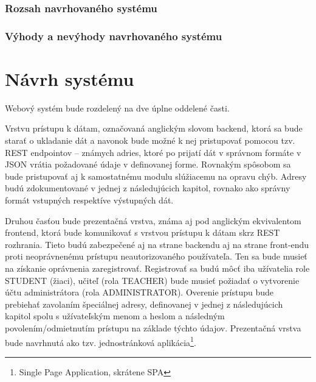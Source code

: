 \documentclass[12pt,oneside]{fithesis2}
\begin{document}
       		\subsection{Rozsah navrhovaného systému}
       		\subsection{Výhody a nevýhody navrhovaného systému}
    \chapter{Návrh systému}
    
    \par Webový systém bude rozdelený na dve úplne oddelené časti.

\par Vrstvu prístupu k dátam, označovaná anglickým slovom backend, ktorá sa bude starať o ukladanie dát a navonok bude možné k nej pristupovať pomocou tzv. REST endpointov – známych adries, ktoré po prijatí dát v správnom formáte v JSON vrátia požadované údaje v definovanej forme. Rovnakým spôsobom sa bude pristupovať aj k samostatnému modulu slúžiacemu na opravu chýb. Adresy budú zdokumentované v jednej z následujúcich kapitol, rovnako ako správny formát vstupných respektíve výstupných dát. 
	\par Druhou časťou bude prezentačná vrstva, známa aj pod anglickým ekvivalentom frontend, ktorá bude komunikovať s vrstvou prístupu k dátam skrz REST rozhrania. Tieto budú zabezpečené aj na strane backendu aj na strane front-endu proti neoprávnenému prístupu neautorizovaného používateľa. Ten sa bude musieť na získanie oprávnenia zaregistrovať. Registrovať sa budú môcť iba užívatelia role STUDENT (žiaci), učiteľ (rola TEACHER) bude musieť požiadať o vytvorenie účtu administrátora (rola ADMINISTRATOR). Overenie prístupu bude prebiehať zavolaním špeciálnej adresy, definovanej v jednej z následujúcich kapitol spolu s užívateľským menom a heslom a následným povolením/odmietnutím prístupu na základe týchto údajov. Prezentačná vrstva bude navrhnutá ako tzv. jednostránková aplikácia\footnote{Single Page Application, skrátene SPA}.
	\pagebreak
\end{document}
